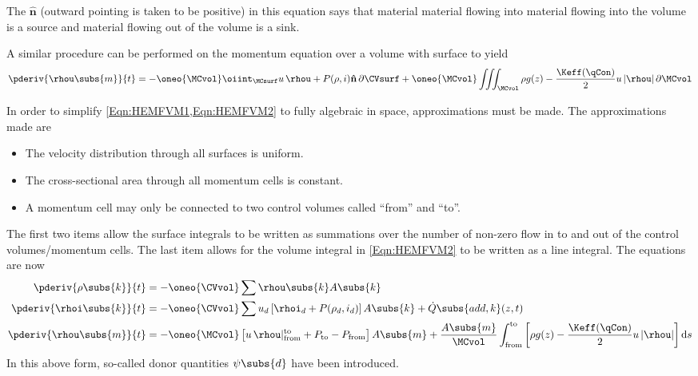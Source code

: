 The $\mathbf{\hat{n}}$ (outward pointing is taken to be positive) in this equation says that material material flowing into material flowing into the volume is a source and material flowing out of the volume is a sink.

A similar procedure can be performed on the momentum equation over a volume \MCvol with surface \MCsurf to yield 
\begin{equation}
    \pderiv{\rhou\subs{m}}{t}
    = -  
    \oneo{\MCvol}
                \oiint_{\MCsurf} u\,\rhou + P(\rho,i) \mathbf{\hat{n}}\,\partial\CVsurf +
    \oneo{\MCvol}\iiint_{\MCvol} \rho{g(z)} - \frac{\Keff(\qCon)}{2} u\,|\rhou| \,\partial\MCvol
    \label{Eqn:HEMFVM2}
\end{equation}

In order to simplify \cref{Eqn:HEMFVM1,Eqn:HEMFVM2} to fully algebraic in space, approximations must be made.
The approximations made are 
\begin{itemize}
    \item{The velocity distribution through all surfaces is uniform.}
    \item{The cross-sectional area through all momentum cells is constant.}
    \item{A momentum cell may only be connected to two control volumes called ``from'' and ``to''.}
\end{itemize}
The first two items allow the surface integrals to be written as summations over the number of non-zero flow in to and out of the control volumes/momentum cells.
The last item allows for the volume integral in \cref{Eqn:HEMFVM2} to be written as a line integral.
The equations are now
\begin{subequations}\label{Eqn:Semidiscrete1}
\begin{align}
    \pderiv{\rho\subs{k}}{t}  &= - \oneo{\CVvol}\sum{\rhou\subs{k} A\subs{k}}\\
    \pderiv{\rhoi\subs{k}}{t} &= - \oneo{\CVvol}\sum{u_d\left[\rhoi_d  + P(\rho_d,i_d)\right] A\subs{k}} + \dot{Q}\subs{add,k}(z,t) \\
    \pderiv{\rhou\subs{m}}{t} &= - \oneo{\MCvol}\left[u\,\rhou\rvert^\text{to}_\text{from} + P_\text{to} - P_\text{from}\right]A\subs{m} + 
                                  \frac{A\subs{m}}{\MCvol}
                                   \int_{\text{from}}^{\text{to}}\left[\rho{g(z)} - \frac{\Keff(\qCon)}{2} u\,|\rhou|\right] \mathrm{d}s
\end{align}
\end{subequations}
In this above form, so-called donor quantities $\psi\subs{d}$ have been introduced.

